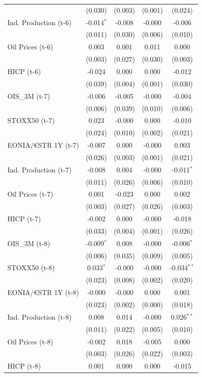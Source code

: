 \begin{longtable}[t]{lcccc}
 & (0.030) & (0.003) & (0.001) & (0.024)\\
Ind. Production (t-6) & -0.014$^{*}$ & -0.008 & -0.000 & -0.006\\
 & (0.011) & (0.030) & (0.006) & (0.010)\\
Oil Prices (t-6) & 0.003 & 0.001 & 0.011 & 0.000\\
 & (0.003) & (0.027) & (0.030) & (0.003)\\
HICP (t-6) & -0.024 & 0.000 & 0.000 & -0.012\\
 & (0.039) & (0.004) & (0.001) & (0.030)\\
OIS\_3M (t-7) & -0.006 & -0.005 & -0.000 & -0.004\\
 & (0.006) & (0.039) & (0.010) & (0.006)\\
STOXX50 (t-7) & 0.023 & -0.000 & 0.000 & -0.010\\
 & (0.024) & (0.010) & (0.002) & (0.021)\\
EONIA/€STR 1Y (t-7) & -0.007 & 0.000 & -0.000 & 0.003\\
 & (0.026) & (0.003) & (0.001) & (0.021)\\
Ind. Production (t-7) & -0.008 & 0.004 & -0.000 & -0.011$^{*}$\\
 & (0.011) & (0.026) & (0.006) & (0.010)\\
Oil Prices (t-7) & 0.001 & -0.023 & 0.000 & 0.002\\
 & (0.003) & (0.027) & (0.026) & (0.003)\\
HICP (t-7) & -0.002 & 0.000 & -0.000 & -0.018\\
 & (0.033) & (0.004) & (0.001) & (0.026)\\
OIS\_3M (t-8) & -0.009$^{*}$ & 0.008 & -0.000 & -0.006$^{*}$\\
 & (0.006) & (0.035) & (0.009) & (0.005)\\
STOXX50 (t-8) & 0.033$^{*}$ & -0.000 & -0.000 & -0.034$^{**}$\\
 & (0.023) & (0.008) & (0.002) & (0.020)\\
EONIA/€STR 1Y (t-8) & -0.000 & -0.000 & 0.000 & 0.001\\
 & (0.023) & (0.002) & (0.000) & (0.018)\\
Ind. Production (t-8) & 0.008 & 0.014 & -0.000 & 0.026$^{**}$\\
 & (0.011) & (0.022) & (0.005) & (0.010)\\
Oil Prices (t-8) & -0.002 & 0.018 & -0.005 & 0.000\\
 & (0.003) & (0.026) & (0.022) & (0.003)\\
HICP (t-8) & 0.001 & 0.000 & 0.000 & -0.015\\

\end{longtable}
